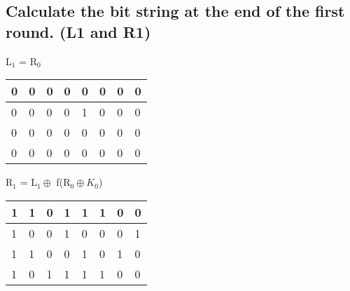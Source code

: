 \subsection{Calculate the bit string at the end of the first round. (L1 and R1)}
\label{section:3b}
L$_{1}$ = R$_{0}$ \\
\begin{tabular}{ | l | l | l | l | l | l | l |  l |  } \hline 
	0 & 0 & 0 & 0 & 0 &  0 & 0 & 0 \\ \hline
	0 & 0 & 0 & 0 & 1 &  0 & 0 & 0 \\ \hline
	0 & 0 & 0 & 0 & 0 &  0 & 0 & 0 \\ \hline
	0 & 0 & 0 & 0 & 0 &  0 & 0 & 0 \\ \hline
\end{tabular}
\clearpage\noindent
R$_{1}$ = L$_{1} \oplus$ f(R$_{0} \oplus K_{0}$)\\
\begin{tabular}{ | l | l | l | l | l | l | l |  l |  } \hline 
	1 & 1 & 0 & 1 & 1 &  1 & 0 & 0 \\ \hline
	1 & 0 & 0 & 1 & 0 &  0 & 0 & 1 \\ \hline
	1 & 1 & 0 & 0 & 1 &  0 & 1 & 0 \\ \hline
	1 & 0 & 1 & 1 & 1 &  1 & 0 & 0 \\ \hline
\end{tabular}

